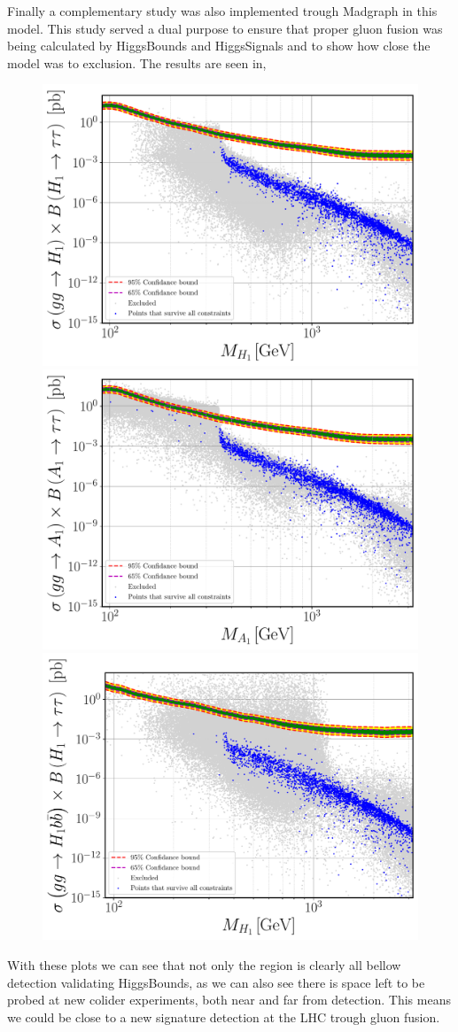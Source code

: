 Finally a complementary study was also implemented trough Madgraph in this model. 
%
This study served a dual purpose to ensure that proper gluon fusion was being calculated by HiggsBounds and HiggsSignals and to show how close the model was to exclusion. The results are seen in, 
%
\begin{figure}[H]
	\centering
	\includegraphics[width=.49\textwidth]{Images/3HDM/Xsec/Xsec_1_Grey_tight.pdf}	\includegraphics[width=.49\textwidth]{Images/3HDM/Xsec/Xsec_2_Colourful_tight.pdf}
	\includegraphics[width=.49\textwidth]{Images/3HDM/Xsec/Xsec_3_Grey_Thight.pdf}
	\caption{}
	\label{}
\end{figure}	
%
With these plots we can see that not only the region is clearly all bellow detection validating HiggsBounds, as we can also see there is space left to be probed at new colider experiments, both near and far from detection. 
%
This means we could be close to a new signature detection at the LHC trough gluon fusion.  



